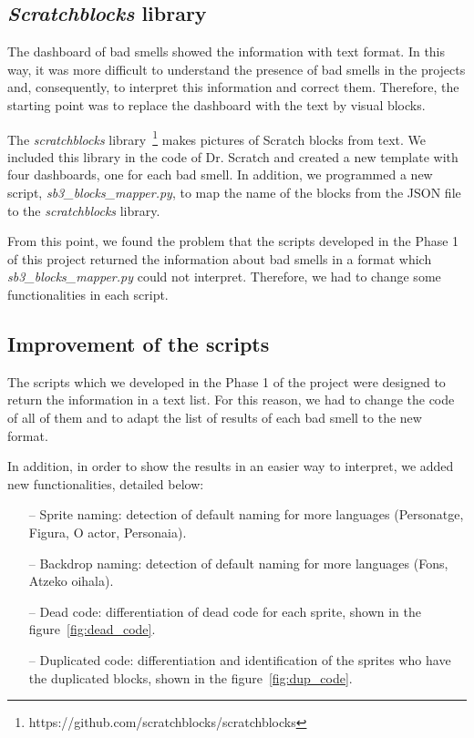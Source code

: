 \subsection{\textit{Scratchblocks} library}
\label{subsec:scratchblocks}

The dashboard of bad smells showed the information with text format. In this way, it was more difficult to understand the presence of bad smells in the projects and, consequently, to interpret this information and correct them. Therefore, the starting point was to replace the dashboard with the text by visual blocks.

The \textit{scratchblocks} library~\footnote{https://github.com/scratchblocks/scratchblocks} makes pictures of Scratch blocks from text. We included this library in the code of Dr. Scratch and created a new template with four dashboards, one for each bad smell. In addition, we programmed a new script, \textit{sb3\_blocks\_mapper.py}, to map the name of the blocks from the JSON file to the \textit{scratchblocks} library.

From this point, we found the problem that the scripts developed in the Phase 1 of this project returned the information about bad smells in a format which \textit{sb3\_blocks\_mapper.py} could not interpret. Therefore, we had to change some functionalities in each script.


\subsection{Improvement of the scripts}
\label{subsec:improvement_scripts}

The scripts which we developed in the Phase 1 of the project were designed to return the information in a text list. For this reason, we had to change the code of all of them and to adapt the list of results of each bad smell to the new format.

In addition, in order to show the results in an easier way to interpret, we added new functionalities, detailed below:

\begin{itemize}
    \item[--] Sprite naming: detection of default naming for more languages (Personatge, Figura, O actor, Personaia).
    \item[--] Backdrop naming: detection of default naming for more languages (Fons, Atzeko oihala).
    \item[--] Dead code: differentiation of dead code for each sprite, shown in the figure~\ref{fig:dead_code}.
    \item[--] Duplicated code: differentiation and identification of the sprites who have the duplicated blocks, shown in the figure~\ref{fig:dup_code}.
\end{itemize}

